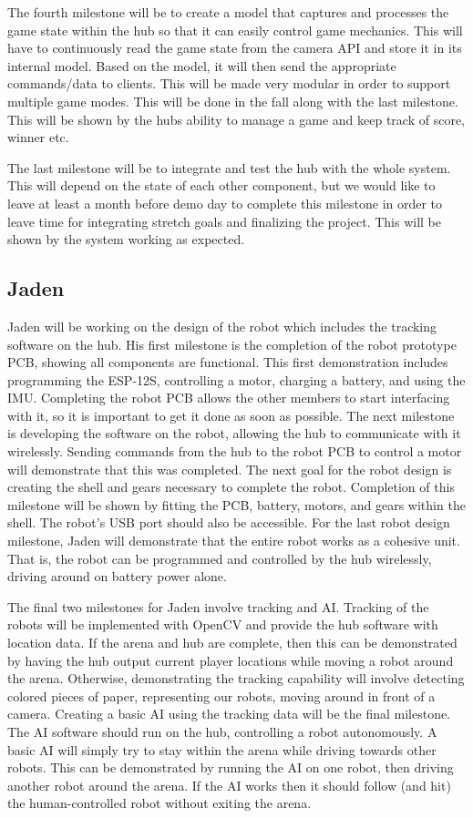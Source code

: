 \documentclass[11pt]{ieeeconf}
\begin{document}
The fourth milestone will be to create a model that captures and processes the game state within the hub so that it can easily control game mechanics. This will have to continuously read the game state from the camera API and store it in its internal model. Based on the model, it will then send the appropriate commands/data to clients. This will be made very modular in order to support multiple game modes. This will be done in the fall along with the last milestone. This will be shown by the hubs ability to manage a game and keep track of score, winner etc.

The last milestone will be to integrate and test the hub with the whole system. This will depend on the state of each other component, but we would like to leave at least a month before demo day to complete this milestone in order to leave time for integrating stretch goals and finalizing the project. This will be shown by the system working as expected.

\subsection{Jaden}
Jaden will be working on the design of the robot which includes the tracking software on the hub. His first milestone is the completion of the robot prototype PCB, showing all components are functional. This first demonstration includes programming the ESP-12S, controlling a motor, charging a battery, and using the IMU. Completing the robot PCB allows the other members to start interfacing with it, so it is important to get it done as soon as possible. The next milestone is developing the software on the robot, allowing the hub to communicate with it wirelessly. Sending commands from the hub to the robot PCB to control a motor will demonstrate that this was completed. The next goal for the robot design is creating the shell and gears necessary to complete the robot. Completion of this milestone will be shown by fitting the PCB, battery, motors, and gears within the shell. The robot's USB port should also be accessible. For the last robot design milestone, Jaden will demonstrate that the entire robot works as a cohesive unit. That is, the robot can be programmed and controlled by the hub wirelessly, driving around on battery power alone.

The final two milestones for Jaden involve tracking and AI. Tracking of the robots will be implemented with OpenCV and provide the hub software with location data. If the arena and hub are complete, then this can be demonstrated by having the hub output current player locations while moving a robot around the arena. Otherwise, demonstrating the tracking capability will involve detecting colored pieces of paper, representing our robots, moving around in front of a camera. Creating a basic AI using the tracking data will be the final milestone. The AI software should run on the hub, controlling a robot autonomously. A basic AI will simply try to stay within the arena while driving towards other robots. This can be demonstrated by running the AI on one robot, then driving another robot around the arena. If the AI works then it should follow (and hit) the human-controlled robot without exiting the arena.
\end{document}

